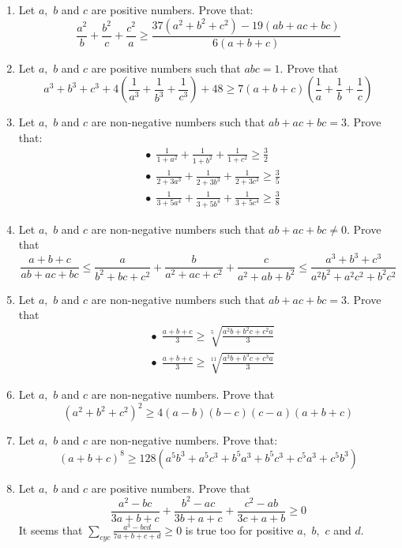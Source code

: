 \documentclass{article}
\begin{document}
\begin{enumerate}
\item  Let $ a,$ $ b$ and $ c$ are positive numbers. Prove that:
\[ \frac {a^2}{b}+\frac {b^2}{c}+\frac {c^2}{a}\geq\frac {37(a^2+b^2+c^2)-19(ab+ac+bc)}{6(a+b+c)}\]

\item  Let $ a,$ $ b$ and $ c$ are positive numbers such that $ abc = 1.$ Prove that
\[ a^3 + b^3 + c^3 + 4\left(\frac  {1}{a^3} + \frac  {1}{b^3} + \frac  {1}{c^3}\right) + 48\geq7(a + b + c)\left(\frac  {1}{a} + \frac  {1}{b} + \frac  {1}{c}\right)\]

\item  Let $ a,$ $ b$ and $ c$ are non-negative numbers such that $ ab+ac+bc=3.$ Prove that:
\[\begin{aligned}&\bullet  \ \ \frac {1}{1+a^2}+\frac {1}{1+b^2}+\frac {1}{1+c^2}\geq\frac {3}{2}\\&\bullet \ \ \frac {1}{2+3a^3}+\frac {1}{2+3b^3}+\frac {1}{2+3c^3}\geq\frac {3}{5}\\& \bullet \ \  \frac {1}{3+5a^4}+\frac {1}{3+5b^4}+\frac {1}{3+5c^4}\geq\frac {3}{8}\end{aligned}\]

\item  Let $ a,$ $ b$ and $ c$ are non-negative numbers such that $ ab + ac + bc\neq0.$ Prove that
\[ \frac {a+b+c}{ab+ac+bc}\leq\frac  {a}{b^2 + bc + c^2} + \frac  {b}{a^2 + ac + c^2} + \frac  {c}{a^2 + ab + b^2}\leq\frac  {a^3 + b^3 + c^3}{a^2b^2 + a^2c^2 + b^2c^2}\]

\item Let $ a,$ $ b$ and $ c$ are non-negative numbers such that $ ab + ac + bc = 3.$  Prove that
\[\begin{aligned}&\bullet \ \ \frac  {a + b + c}{3}\geq\sqrt [5]{\frac  {a^2b + b^2c + c^2a}{3}}\\&\bullet \ \ \frac  {a + b + c}{3}\geq\sqrt [11]{\frac  {a^3b + b^3c + c^3a}{3}}\end{aligned}\]

\item  Let $ a,$ $ b$ and $ c$ are non-negative numbers. Prove that
\[ (a^2+b^2+c^2)^2 \geq 4(a-b)(b-c)(c-a)(a+b+c)\]

\item  Let $ a,$ $ b$ and $ c$ are non-negative numbers. Prove that:
\[ (a+b+c)^8\geq128(a^5b^3+a^5c^3+b^5a^3+b^5c^3+c^5a^3+c^5b^3)\]

\item  Let $ a,$ $ b$ and $ c$ are positive numbers. Prove that
\[ \frac  {a^2 - bc}{3a + b + c} + \frac  {b^2 - ac}{3b + a + c} + \frac  {c^2 - ab}{3c + a + b}\geq0
\]
It seems that $ \displaystyle\sum_{cyc}\frac {a^3-bcd}{7a+b+c+d}\geq0$ is true too for positive $ a,$ $ b,$ $ c$ and $ d.$\\


\end{enumerate}
\end{document}
